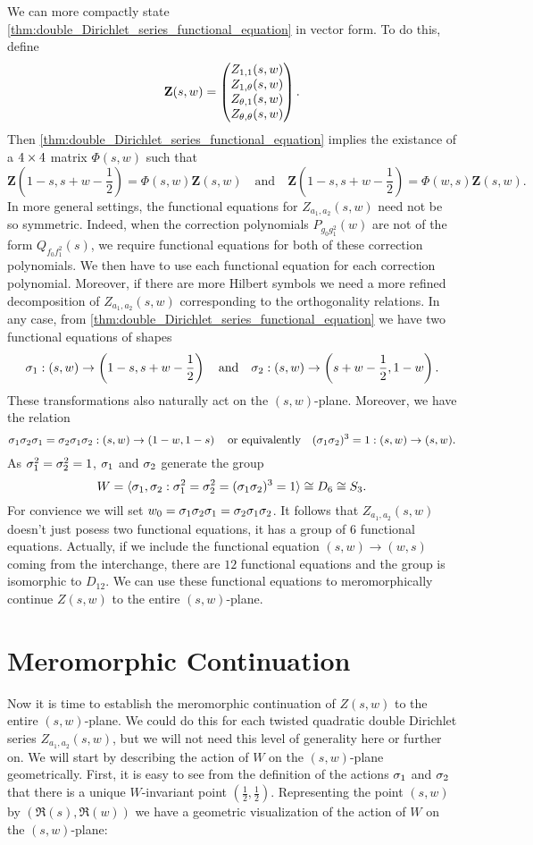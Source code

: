 \documentclass[12pt,reqno,oneside]{amsart}
\begin{document}
    We can more compactly state \cref{thm:double_Dirichlet_series_functional_equation} in vector form. To do this, define
    \[
        \mathbf{Z}(s,w) = \begin{pmatrix} Z_{1,1}(s,w) \\ Z_{1,\theta}(s,w) \\ Z_{\theta,1}(s,w) \\ Z_{\theta,\theta}(s,w) \end{pmatrix}.
    \]
    Then \cref{thm:double_Dirichlet_series_functional_equation} implies the existance of a $4 \times 4$ matrix $\Phi(s,w)$ such that
    \[
        \mathbf{Z}\left(1-s,s+w-\frac{1}{2}\right) = \Phi(s,w)\mathbf{Z}(s,w) \quad \text{and} \quad \mathbf{Z}\left(1-s,s+w-\frac{1}{2}\right) = \Phi(w,s)\mathbf{Z}(s,w).
    \]
    In more general settings, the functional equations for $Z_{a_{1},a_{2}}(s,w)$ need not be so symmetric. Indeed, when the correction polynomials $P_{g_{0}g_{1}^{2}}(w)$ are not of the form $Q_{f_{0}f_{1}^{2}}(s)$, we require functional equations for both of these correction polynomials. We then have to use each functional equation for each correction polynomial. Moreover, if there are more Hilbert symbols we need a more refined decomposition of $Z_{a_{1},a_{2}}(s,w)$ corresponding to the orthogonality relations. In any case, from \cref{thm:double_Dirichlet_series_functional_equation} we have two functional equations of shapes
    \[
        \sigma_{1}:(s,w) \to \left(1-s,s+w-\frac{1}{2}\right) \quad \text{and} \quad \sigma_{2}:(s,w) \to \left(s+w-\frac{1}{2},1-w\right).
    \]
    These transformations also naturally act on the $(s,w)$-plane. Moreover, we have the relation
    \[
        \sigma_{1}\sigma_{2}\sigma_{1} = \sigma_{2}\sigma_{1}\sigma_{2}:(s,w) \to \left(1-w,1-s\right) \quad \text{or equivalently} \quad (\sigma_{1}\sigma_{2})^{3} = 1:(s,w) \to (s,w).
    \]
    As $\sigma_{1}^{2} = \sigma_{2}^{2} = 1$, $\sigma_{1}$ and $\sigma_{2}$ generate the group
    \[
        W = \langle\sigma_{1},\sigma_{2}:\sigma_{1}^{2} = \sigma_{2}^{2} = (\sigma_{1}\sigma_{2})^{3} = 1\rangle \cong D_{6} \cong S_{3}.
    \]
    For convience we will set $w_{0} = \sigma_{1}\sigma_{2}\sigma_{1} = \sigma_{2}\sigma_{1}\sigma_{2}$. It follows that $Z_{a_{1},a_{2}}(s,w)$ doesn't just posess two functional equations, it has a group of $6$ functional equations. Actually, if we include the functional equation $(s,w) \to (w,s)$ coming from the interchange, there are $12$ functional equations and the group is isomorphic to $D_{12}$. We can use these functional equations to meromorphically continue $Z(s,w)$ to the entire $(s,w)$-plane.
\section{Meromorphic Continuation}
    Now it is time to establish the meromorphic continuation of $Z(s,w)$ to the entire $(s,w)$-plane. We could do this for each twisted quadratic double Dirichlet series $Z_{a_{1},a_{2}}(s,w)$, but we will not need this level of generality here or further on. We will start by describing the action of $W$ on the $(s,w)$-plane geometrically. First, it is easy to see from the definition of the actions $\sigma_{1}$ and $\sigma_{2}$ that there is a unique $W$-invariant point $\left(\frac{1}{2},\frac{1}{2}\right)$. Representing the point $(s,w)$ by $(\Re(s),\Re(w))$ we have a geometric visualization of the action of $W$ on the $(s,w)$-plane:
\end{document}
